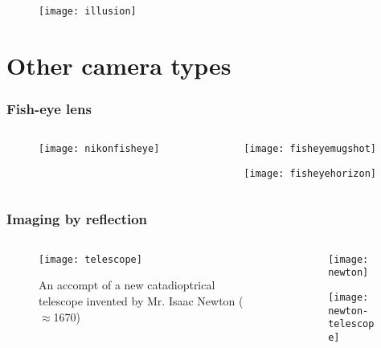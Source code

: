\begin{frame}
\begin{figure}[!h]
\centering
\texttt{[image: illusion]}
\end{figure}
\end{frame}

\section{Other camera types}

\begin{frame}
\frametitle{Fish-eye lens}
\begin{columns}
\begin{column}{.5\textwidth}
\begin{figure}[!h]
\centering
\texttt{[image: nikonfisheye]}
\end{figure}
\end{column}
\begin{column}{.5\textwidth}
\begin{figure}[!h]
\centering
\texttt{[image: fisheyemugshot]}
\end{figure}
\begin{figure}[!h]
\centering
\texttt{[image: fisheyehorizon]}
\end{figure}
\end{column}
\end{columns}
\end{frame}

\begin{frame}
\frametitle{Imaging by reflection}
\begin{columns}
\begin{column}{.5\textwidth}
\begin{figure}[!h]
\centering
\texttt{[image: telescope]}
\caption{An accompt of a new catadioptrical telescope invented by Mr. Isaac Newton ($\approx$1670)}
\end{figure}
\end{column}
\begin{column}{.5\textwidth}
\begin{figure}[!h]
\centering
\texttt{[image: newton]}
\end{figure}
\begin{figure}[!h]
\centering
\texttt{[image: newton-telescope]}
\end{figure}
\end{column}
\end{columns}
\end{frame}


